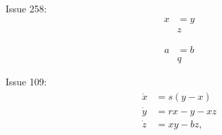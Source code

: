 \documentclass{article}
\begin{document}
Issue 258:
\begin{equation}\label{eq:1}
\begin{split}
x &= y \\
& z
\end{split}
\end{equation}

\begin{equation}\label{eq:2}
\begin{split}
a &= b \\
& q
\end{split}
\end{equation}


Issue 109: 
\begin{align}
\begin{split}
    \dot{x} &= s (y - x)\label{eqn:lorenz}\\
    \dot{y} &= r x - y - x z \\
    \dot{z} &= x y - b z,
\end{split}
\end{align}
\end{document}
